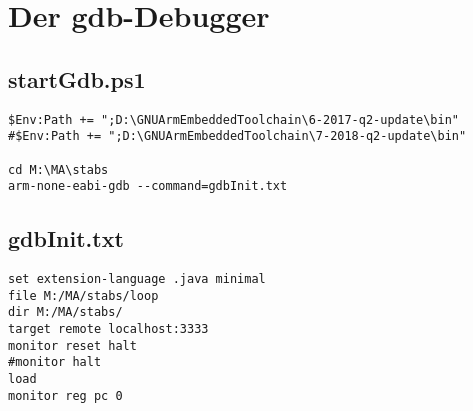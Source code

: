 \section{Der gdb-Debugger}
\subsection{startGdb.ps1}
\label{anhang:startGdb.ps1}
\lstset{language=sh}
\begin{lstlisting}
$Env:Path += ";D:\GNUArmEmbeddedToolchain\6-2017-q2-update\bin"
#$Env:Path += ";D:\GNUArmEmbeddedToolchain\7-2018-q2-update\bin"

cd M:\MA\stabs
arm-none-eabi-gdb --command=gdbInit.txt
\end{lstlisting}


\subsection{gdbInit.txt}
\label{anhang:gdbInit.txt}
\lstset{language=plain}
\begin{lstlisting}
set extension-language .java minimal
file M:/MA/stabs/loop
dir M:/MA/stabs/
target remote localhost:3333
monitor reset halt
#monitor halt
load
monitor reg pc 0
\end{lstlisting}